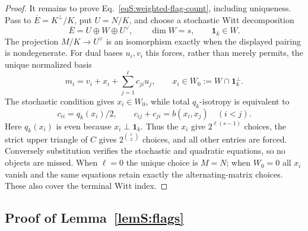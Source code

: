 \documentclass[journal,twocolumn]{IEEEtran}
\theoremstyle{definition}
\theoremstyle{plain}
\newcommand{\one}{\bm 1}
\begin{document}
\begin{proof}
It remains to prove Eq.~\eqref{eqS:weighted-flag-count}, including
uniqueness.  Pass to $\overline E=K^\perp/K$, put $U=N/K$, and choose a
stochastic Witt decomposition
\begin{equation}
 \overline E=U\oplus W\oplus U^\vee,
 \qquad \dim W=s,\qquad\one_k\in W.
\end{equation}
The projection $M/K\to U^\vee$ is an isomorphism exactly when the displayed
pairing is nondegenerate.  For dual bases $u_i,v_i$ this forces, rather than
merely permits, the unique normalized basis
\begin{equation}
 m_i=v_i+x_i+\sum_{j=1}^{\ell}c_{ji}u_j,
 \qquad x_i\in W_0:=W\cap\one_k^\perp.
 \label{eqS:weighted-normal-form}
\end{equation}
The stochastic condition gives $x_i\in W_0$, while total $q_k$-isotropy is
equivalent to
\begin{equation}
 c_{ii}=q_k(x_i)/2,
 \qquad c_{ij}+c_{ji}=b(x_i,x_j)\quad(i<j).
 \label{eqS:weighted-normal-form-equations}
\end{equation}
Here $q_k(x_i)$ is even because $x_i\perp\one_k$.  Thus the $x_i$ give
$2^{\ell(s-1)}$ choices, the strict upper triangle of $C$ gives
$2^{\binom\ell2}$ choices, and all other entries are forced.  Conversely
substitution verifies the stochastic and quadratic equations, so no
objects are missed.  When $\ell=0$ the unique choice is $M=N$; when
$W_0=0$ all $x_i$ vanish and the same equations retain exactly the
alternating-matrix choices.  These also cover the terminal Witt index.
\end{proof}

\subsection{Proof of Lemma~\ref{lemS:flags}}
\label{app:proof-flags}
\end{document}

